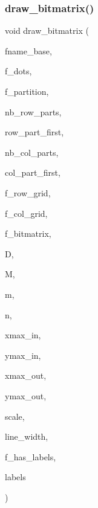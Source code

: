 \subsubsection{\texorpdfstring{draw\+\_\+bitmatrix()}{draw\_bitmatrix()}}
{\footnotesize\ttfamily void draw\+\_\+bitmatrix (\begin{DoxyParamCaption}\item[{const \mbox{\hyperlink{galois_8h_ab6cc7b4aeb6ea31aba2b3fbfc83ff5e6}{B\+Y\+TE}} $\ast$}]{fname\+\_\+base,  }\item[{\mbox{\hyperlink{galois_8h_a09fddde158a3a20bd2dcadb609de11dc}{I\+NT}}}]{f\+\_\+dots,  }\item[{\mbox{\hyperlink{galois_8h_a09fddde158a3a20bd2dcadb609de11dc}{I\+NT}}}]{f\+\_\+partition,  }\item[{\mbox{\hyperlink{galois_8h_a09fddde158a3a20bd2dcadb609de11dc}{I\+NT}}}]{nb\+\_\+row\+\_\+parts,  }\item[{\mbox{\hyperlink{galois_8h_a09fddde158a3a20bd2dcadb609de11dc}{I\+NT}} $\ast$}]{row\+\_\+part\+\_\+first,  }\item[{\mbox{\hyperlink{galois_8h_a09fddde158a3a20bd2dcadb609de11dc}{I\+NT}}}]{nb\+\_\+col\+\_\+parts,  }\item[{\mbox{\hyperlink{galois_8h_a09fddde158a3a20bd2dcadb609de11dc}{I\+NT}} $\ast$}]{col\+\_\+part\+\_\+first,  }\item[{\mbox{\hyperlink{galois_8h_a09fddde158a3a20bd2dcadb609de11dc}{I\+NT}}}]{f\+\_\+row\+\_\+grid,  }\item[{\mbox{\hyperlink{galois_8h_a09fddde158a3a20bd2dcadb609de11dc}{I\+NT}}}]{f\+\_\+col\+\_\+grid,  }\item[{\mbox{\hyperlink{galois_8h_a09fddde158a3a20bd2dcadb609de11dc}{I\+NT}}}]{f\+\_\+bitmatrix,  }\item[{\mbox{\hyperlink{galois_8h_a122c4acf389c050379f00341fdcd5812}{U\+B\+Y\+TE}} $\ast$}]{D,  }\item[{\mbox{\hyperlink{galois_8h_a09fddde158a3a20bd2dcadb609de11dc}{I\+NT}} $\ast$}]{M,  }\item[{\mbox{\hyperlink{galois_8h_a09fddde158a3a20bd2dcadb609de11dc}{I\+NT}}}]{m,  }\item[{\mbox{\hyperlink{galois_8h_a09fddde158a3a20bd2dcadb609de11dc}{I\+NT}}}]{n,  }\item[{\mbox{\hyperlink{galois_8h_a09fddde158a3a20bd2dcadb609de11dc}{I\+NT}}}]{xmax\+\_\+in,  }\item[{\mbox{\hyperlink{galois_8h_a09fddde158a3a20bd2dcadb609de11dc}{I\+NT}}}]{ymax\+\_\+in,  }\item[{\mbox{\hyperlink{galois_8h_a09fddde158a3a20bd2dcadb609de11dc}{I\+NT}}}]{xmax\+\_\+out,  }\item[{\mbox{\hyperlink{galois_8h_a09fddde158a3a20bd2dcadb609de11dc}{I\+NT}}}]{ymax\+\_\+out,  }\item[{double}]{scale,  }\item[{double}]{line\+\_\+width,  }\item[{\mbox{\hyperlink{galois_8h_a09fddde158a3a20bd2dcadb609de11dc}{I\+NT}}}]{f\+\_\+has\+\_\+labels,  }\item[{\mbox{\hyperlink{galois_8h_a09fddde158a3a20bd2dcadb609de11dc}{I\+NT}} $\ast$}]{labels }\end{DoxyParamCaption})}

